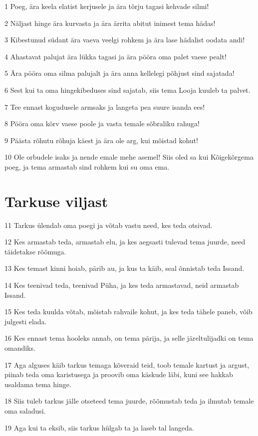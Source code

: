\par 1 Poeg, ära keela elatist kerjusele ja ära tõrju tagasi kehvade silmi!
\par 2 Näljast hinge ära kurvasta ja ära ärrita abitut inimest tema hädas!
\par 3 Kibestunud südant ära vaeva veelgi rohkem ja ära lase hädalist oodata andi!
\par 4 Ahastavat palujat ära lükka tagasi ja ära pööra oma palet vaese pealt!
\par 5 Ära pööra oma silma palujalt ja ära anna kellelegi põhjust sind sajatada!
\par 6 Sest kui ta oma hingekibeduses sind sajatab, siis tema Looja kuuleb ta palvet.
\par 7 Tee ennast kogudusele armsaks ja langeta pea suure isanda ees!
\par 8 Pööra oma kõrv vaese poole ja vasta temale sõbraliku rahuga!
\par 9 Päästa rõhutu rõhuja käest ja ära ole arg, kui mõistad kohut!
\par 10 Ole orbudele isaks ja nende emale mehe asemel! Siis oled sa kui Kõigekõrgema poeg, ja tema armastab sind rohkem kui su oma ema.

\section*{Tarkuse viljast}

\par 11 Tarkus ülendab oma poegi ja võtab vastu need, kes teda otsivad.
\par 12 Kes armastab teda, armastab elu, ja kes aegsasti tulevad tema juurde, need täidetakse rõõmuga.
\par 13 Kes temast kinni hoiab, pärib au, ja kus ta käib, seal õnnistab teda Issand.
\par 14 Kes teenivad teda, teenivad Püha, ja kes teda armastavad, neid armastab Issand.
\par 15 Kes teda kuulda võtab, mõistab rahvaile kohut, ja kes teda tähele paneb, võib julgesti elada.
\par 16 Kes ennast tema hooleks annab, on tema pärija, ja selle järeltulijadki on tema omandiks.
\par 17 Aga alguses käib tarkus temaga kõveraid teid, toob temale kartust ja argust, piinab teda oma karistusega ja proovib oma käskude läbi, kuni see hakkab usaldama tema hinge.
\par 18 Siis tuleb tarkus jälle otseteed tema juurde, rõõmustab teda ja ilmutab temale oma saladusi.
\par 19 Aga kui ta eksib, siis tarkus hülgab ta ja laseb tal langeda.

